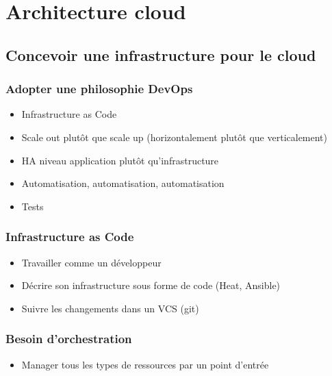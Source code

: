   \section{Architecture cloud}

  \subsection{Concevoir une infrastructure pour le cloud}

  \begin{frame}
    \frametitle{Adopter une philosophie DevOps}
    \begin{itemize}
      \item Infrastructure as Code
      \item Scale out plutôt que scale up (horizontalement plutôt que verticalement)
      \item HA niveau application plutôt qu'infrastructure
      \item Automatisation, automatisation, automatisation
      \item Tests
    \end{itemize}
  \end{frame}


  \begin{frame}
    \frametitle{Infrastructure as Code}
    \begin{itemize}
      \item Travailler comme un développeur
      \item Décrire son infrastructure sous forme de code (Heat, Ansible)
      \item Suivre les changements dans un VCS (git)
    \end{itemize}
  \end{frame}

  \begin{frame}
    \frametitle{Besoin d'orchestration}
    \begin{itemize}
      \item Manager tous les types de ressources par un point d'entrée
    \end{itemize}
  \end{frame}

